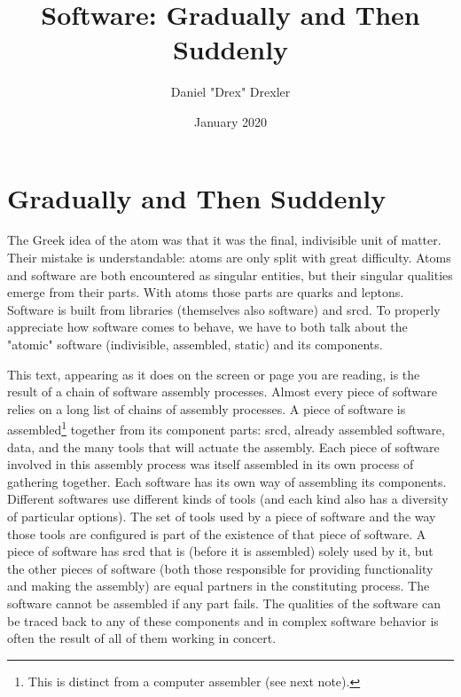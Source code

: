 \documentclass[a4paper,man,natbib]{apa6}
\title{Software: Gradually and Then Suddenly}
\author{Daniel "Drex" Drexler}
\affiliation{Center for Science, Technology and Society at Drexel University}
\date{January 2020}
\begin{document}
   \maketitle
   \section*{Gradually and Then Suddenly}
   
   The Greek idea of the atom was that it was the final, indivisible unit of matter. Their mistake is understandable: atoms are only split with great difficulty. Atoms and software are both encountered as singular entities, but their singular qualities emerge from their parts. With atoms those parts are quarks and leptons. Software is built from libraries (themselves also software) and \gls{srcd}. To properly appreciate how software comes to behave, we have to both talk about the "atomic" software (indivisible, assembled, static) and its components. 

   This text, appearing as it does on the screen or page you are reading, is the result of a chain of software assembly processes. Almost every piece of software relies on a long list of chains of assembly processes. A piece of software is assembled\footnote{This is distinct from a computer assembler (see next note).} together from its component parts: \gls{srcd}, already assembled software, data, and the many tools that will actuate the assembly\footnotemark. Each piece of software involved in this assembly process was itself assembled in its own process of gathering together. Each software has its own way of assembling its components. Different softwares use different kinds of tools (and each kind also has a diversity of particular options). The set of tools used by a piece of software and the way those tools are configured is part of the existence of that piece of software. A piece of software has \gls{srcd} that is (before it is assembled) solely used by it, but the other pieces of software (both those responsible for providing functionality and making the assembly) are equal partners in the constituting process. The software cannot be assembled if any part fails. The qualities of the software can be traced back to any of these components and in complex software behavior is often the result of all of them working in concert.

\end{document}
